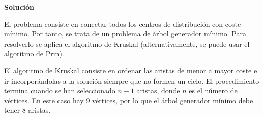\newcommand{\grafoLogiMaxSeleccion}[2]{
\begin{center}
\begin{tikzpicture}[scale=0.72]
\coordLogiMax
\aristasLogiMax
#1
\pesosLogiMax
\nodosLogiMax
\foreach \n in {#2}{
\node[logiNodeSol] at (\n) {$\mathbf{\n}$};
}
\end{tikzpicture}
\end{center}
}

\textbf{Solución}

El problema consiste en conectar todos los centros de distribución con coste mínimo. Por tanto, se trata de un problema de árbol generador mínimo. Para resolverlo se aplica el algoritmo de Kruskal (alternativamente, se puede usar el algoritmo de Prin).

El algoritmo de Kruskal consiste en ordenar las aristas de menor a mayor coste e ir incorporándolas a la solución siempre que no formen un ciclo. El procedimiento termina cuando se han seleccionado $n-1$ aristas, donde $n$ es el número de vértices. En este caso hay $9$ vértices, por lo que el árbol generador mínimo debe tener $8$ aristas.


